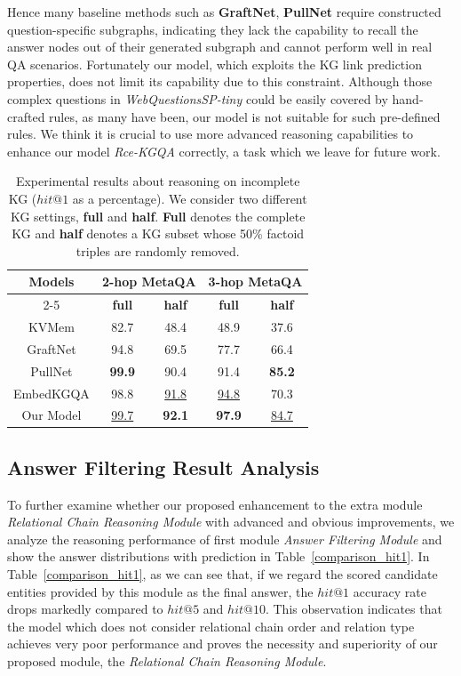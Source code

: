 \documentclass[pdflatex,sn-mathphys]{sn-jnl}%
\theoremstyle{thmstyleone}%
\theoremstyle{thmstyletwo}%
\theoremstyle{thmstylethree}%
\begin{document}
Hence many baseline methods such as \textbf{GraftNet}, \textbf{PullNet} require constructed question-specific subgraphs, indicating they lack the capability to recall the answer nodes out of their generated subgraph and cannot perform well in real QA scenarios. Fortunately our model, which exploits the KG link prediction properties, does not limit its capability due to this constraint. Although those complex questions in \textit{WebQuestionsSP-tiny} could be easily covered by hand-crafted rules, as many have been, our model is not suitable for such pre-defined rules. We think it is crucial to use more advanced reasoning capabilities to enhance our model \textit{Rce-KGQA} correctly, a task which we leave for future work.

\begin{table}[h]
    \centering
    \begin{tabular}{c|c|c|c|c} \hline
        \multirow{2}{*}{Models} & \multicolumn{2}{c}{2-hop MetaQA} & \multicolumn{2}{c}{3-hop MetaQA}\\ \cline{2-5}
         & \textbf{full} & \textbf{half} & \textbf{full} & \textbf{half} \\ \hline
        KVMem & 82.7 & 48.4 & 48.9 & 37.6 \\
        GraftNet & 94.8 & 69.5 & 77.7 & 66.4 \\
        PullNet & \bf{99.9} & 90.4 & 91.4 & \bf{85.2} \\
        EmbedKGQA & 98.8 & \underline{91.8} & \underline{94.8} & 70.3 \\ \hline
        Our Model  & \underline{99.7} & \bf{92.1} & \bf{97.9} & \underline{84.7} \\ \hline
    \end{tabular}
    \caption{Experimental results about reasoning on incomplete KG ($hit@1$ as a percentage). We consider two different KG settings, \textbf{full} and \textbf{half}. \textbf{Full} denotes the complete KG and \textbf{half} denotes a KG subset whose 50\% factoid triples are randomly removed.}
    \label{comparison_full_half}
\end{table}

\subsection{Answer Filtering Result Analysis}
To further examine whether our proposed enhancement to the extra module \textit{Relational Chain Reasoning Module} with advanced and obvious improvements, we analyze the reasoning performance of first module \textit{Answer Filtering Module} and show the answer distributions with prediction in Table~\ref{comparison_hit1}. In Table~\ref{comparison_hit1}, as we can see that, if we regard the scored candidate entities provided by this module as the final answer, the $hit@1$ accuracy rate drops markedly compared to $hit@5$ and $hit@10$. This observation indicates that the model which does not consider relational chain order and relation type achieves very poor performance and proves the necessity and superiority of our proposed module, the \textit{Relational Chain Reasoning Module}.
\end{document}
